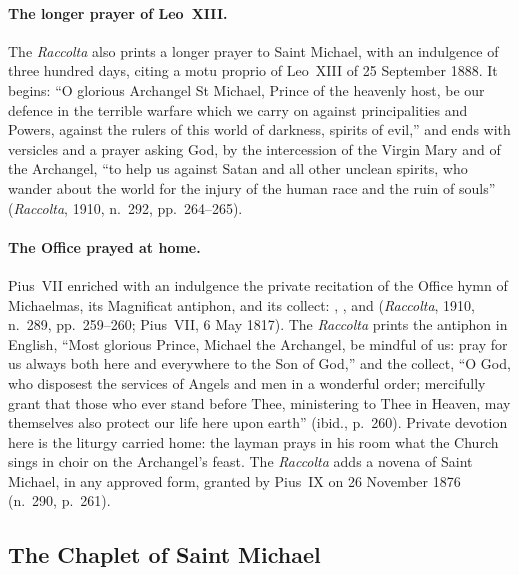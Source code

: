 \paragraph{The longer prayer of Leo~XIII.} The \emph{Raccolta} also
prints a longer prayer to Saint Michael, with an indulgence of three
hundred days, citing a motu proprio of Leo~XIII of 25 September 1888. It
begins: ``O glorious Archangel St Michael, Prince of the heavenly host, be
our defence in the terrible warfare which we carry on against
principalities and Powers, against the rulers of this world of darkness,
spirits of evil,'' and ends with versicles and a prayer asking God, by the
intercession of the Virgin Mary and of the Archangel, ``to help us against
Satan and all other unclean spirits, who wander about the world for the
injury of the human race and the ruin of souls'' (\emph{Raccolta}, 1910,
n.~292, pp.~264--265).

\paragraph{The Office prayed at home.} Pius~VII enriched with an
indulgence the private recitation of the Office hymn of Michaelmas, its
Magnificat antiphon, and its collect: , , and  (\emph{Raccolta}, 1910, n.~289,
pp.~259--260; Pius~VII, 6 May 1817). The \emph{Raccolta} prints the
antiphon in English, ``Most glorious Prince, Michael the Archangel, be
mindful of us: pray for us always both here and everywhere to the Son of
God,'' and the collect, ``O God, who disposest the services of Angels and
men in a wonderful order; mercifully grant that those who ever stand
before Thee, ministering to Thee in Heaven, may themselves also protect
our life here upon earth'' (ibid., p.~260). Private devotion here is the
liturgy carried home: the layman prays in his room what the Church sings
in choir on the Archangel's feast. The \emph{Raccolta} adds a novena of
Saint Michael, in any approved form, granted by Pius~IX on 26 November
1876 (n.~290, p.~261).

\sectionguard
\subsection{The Chaplet of Saint Michael}

